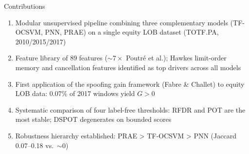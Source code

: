 \documentclass{beamer}
\begin{document}
\begin{frame}{Contributions}
    \begin{enumerate}
        \item Modular unsupervised pipeline combining three complementary models (TF-OCSVM, PNN, PRAE) on a single equity LOB dataset (TOTF.PA, 2010/2015/2017)
        \item Feature library of 89 features (${\sim}7\times$ Poutr{\'e} et al.); Hawkes limit-order memory and cancellation features identified as top drivers across all models
        \item First application of the spoofing gain framework (Fabre \& Challet) to equity LOB data: 0.07\% of 2017 windows yield $G > 0$
        \item Systematic comparison of four label-free thresholds: RFDR and POT are the most stable; DSPOT degenerates on bounded scores
        \item Robustness hierarchy established: PRAE > TF-OCSVM > PNN (Jaccard 0.07--0.18 vs.\ ${\sim}0$)
    \end{enumerate}
\end{frame}
\end{document}

